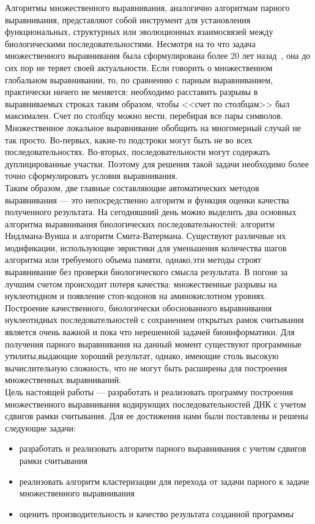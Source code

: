 \indent Алгоритмы множественного выравнивания, аналогично алгоритмам парного выравнивания, представляют собой инструмент для установления функциональных, структурных или эволюционных взаимосвязей между биологическими последовательностями.  Несмотря на то что задача множественного выравнивания была сформулирована более 20 лет назад~\cite{SIAM_Journal}, она до сих пор не теряет своей актуальности. Если говорить о множественном глобальном выравнивании, то, по сравнению с парным выравниванием, практически ничего не меняется: необходимо расставить разрывы в выравниваемых строках таким образом, чтобы <<счет по столбцам>> был максимален. Счет по столбцу можно вести, перебирая все пары символов. Множественное локальное выравнивание обобщить на многомерный случай не так просто. Во-первых, какие-то подстроки могут быть не во всех последовательностях. Во-вторых, последовательности могут содержать дуплицированные участки. Поэтому для решения такой задачи необходимо более точно сформулировать условия выравнивания.\\ 
\indent Таким образом, две главные составляющие автоматических методов выравнивания --- это непосредственно алгоритм и функция оценки качества полученного результата. На сегодняшний день можно выделить два основных алгоритма выравнивания биологических последовательностей: алгоритм Нидлмана-Вунша и алгоритм Смита-Ватермана.  Существуют различные их модификации, использующие эвристики для уменьшения количества шагов алгоритма или требуемого объема памяти, однако,эти методы строят выравнивание без проверки биологического смысла результата. В погоне за лучшим счетом происходит потеря качества: множественные разрывы на нуклеотидном и появление стоп-кодонов на аминокислотном уровнях.\\ 
\indent Построение качественного, биологически обоснованного выравнивания нуклеотидных последовательностей с сохранением открытых рамок считывания является очень важной и пока что нерешенной задачей биоинформатики. Для получения парного выравнивания на данный момент существуют программные утилиты,выдающие хороший результат, однако, имеющие столь высокую вычислительную сложность, что не могут быть расширены для построения множественных выравниваний.\\ 
\indent Цель настоящей работы --- разработать и реализовать программу построения множественного выравнивания кодирующих последовательностей ДНК с учетом сдвигов рамки считывания. Для ее достижения нами были поставлены и решены следующие задачи:
\begin{itemize}
\item разработать и реализовать алгоритм парного выравнивания с учетом сдвигов рамки считывания
\item реализовать алгоритм кластеризации для перехода от задачи парного к задаче множественного выравнивания
\item оценить производительность и качество результата созданной программы
\end{itemize}

